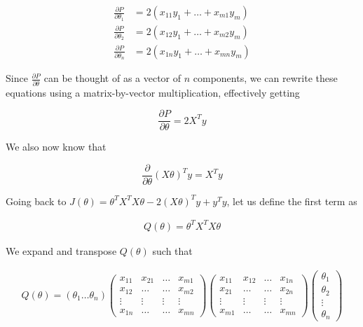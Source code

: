 \begin{align*}
    \frac{\partial P}{\partial \theta_1}    &= 2(x_{11}y_1+\dots+x_{m1}y_m) \\
    \frac{\partial P}{\partial \theta_2}    &= 2(x_{12}y_1+\dots+x_{m2}y_m) \\
    \frac{\partial P}{\partial \theta_n}    &= 2(x_{1n}y_1+\dots+x_{mn}y_m)
\end{align*}

\noindent Since $\frac{\partial P}{\partial\theta}$ can be thought of as a vector of $n$ components,
we can rewrite these equations using a matrix-by-vector multiplication, effectively getting

\begin{equation*}
    \frac{\partial P}{\partial\theta} = 2X^T y
\end{equation*}

\noindent We also now know that

\begin{equation*}
    \frac{\partial}{\partial\theta} (X\theta)^T y = X^T y
\end{equation*}

\noindent Going back to $J(\theta) = \theta^T X^T X\theta-2(X\theta)^T y+y^T y$, let us define the
first term as

\begin{align*}
    Q(\theta) = \theta^T X^T X\theta
\end{align*}

\noindent We expand and transpose $Q(\theta)$ such that

\begin{align*}
    Q(\theta) = (\theta_1\dots\theta_n)
    \begin{pmatrix}
        x_{11} & x_{21} & \dots & x_{m1} \\
        x_{12} & \dots  & \dots & x_{m2} \\
        \vdots & \vdots & \vdots & \vdots \\
        x_{1n} & \dots  & \dots & x_{mn}
    \end{pmatrix}
    \begin{pmatrix}
        x_{11} & x_{12} & \dots & x_{1n} \\
        x_{21} & \dots  & \dots & x_{2n} \\
        \vdots & \vdots & \vdots & \vdots \\
        x_{m1} & \dots  & \dots & x_{mn}
    \end{pmatrix}
    \begin{pmatrix}
        \theta_1 \\
        \theta_2 \\
        \vdots \\
        \theta_n
    \end{pmatrix}
\end{align*}

